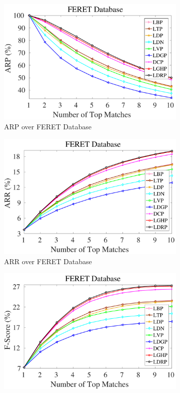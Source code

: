 \documentclass[a4paper]{article}
\begin{document}
\begin{figure}[!t]
  \begin{subfigure}{.25\textwidth}
    \centering
    \includegraphics[width=.98\linewidth]{feret-arp}
    \caption{ARP over FERET Database}
    \label{fig:feret-arp}
  \end{subfigure}%
    \begin{subfigure}{.25\textwidth}
    \centering
    \includegraphics[width=.98\linewidth]{feret-arr}
    \caption{ARR over FERET Database}
    \label{fig:feret-arr}
  \end{subfigure}%
    \begin{subfigure}{.25\textwidth}
    \centering
    \includegraphics[width=.98\linewidth]{feret-f}

\end{subfigure}
\end{figure}
\end{document}
